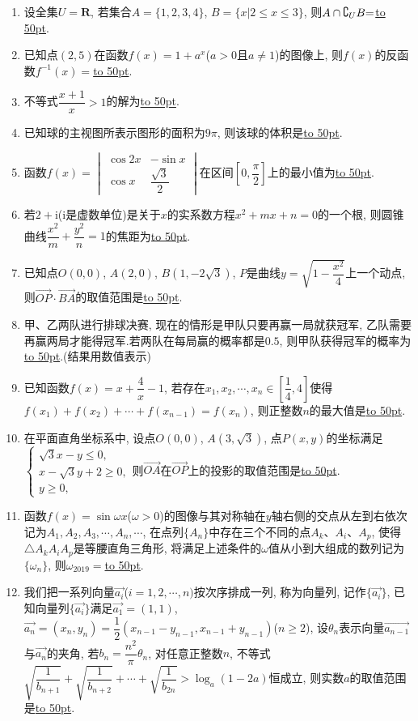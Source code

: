 \documentclass[10pt,a4paper]{article}
\newcommand{\blank}[1]{\underline{\hbox to #1pt{}}}
\begin{document}
\begin{enumerate}[1.]
\item 设全集$U=\mathbf{R}$, 若集合$A=\{1,2,3,4\}$, $B=\{x|2\le x\le 3\}$, 则$A\cap \complement _UB\text=$\blank{50}.
\item 已知点$(2,5)$在函数$f(x)=1+a^x$($a>0$且$a\ne 1$)的图像上, 则$f(x)$的反函数$f^{-1}(x)=$\blank{50}.
\item 不等式$\dfrac{x+1}x>1$的解为\blank{50}.
\item 已知球的主视图所表示图形的面积为$9\pi$, 则该球的体积是\blank{50}.
\item 函数$f(x)=\begin{vmatrix}
\cos 2x & -\sin x  \\\cos x & \dfrac{\sqrt 3}2  \end{vmatrix}$在区间$[0,\dfrac{\pi}{2}]$上的最小值为\blank{50}.
\item 若$2+\mathrm{i}$($\mathrm{i}$是虚数单位)是关于$x$的实系数方程$x^2+mx+n=0$的一个根, 则圆锥曲线$\dfrac{x^2}m+\dfrac{y^2}n=1$的焦距为\blank{50}.
\item 已知点$O(0,0)$, $A(2,0)$, $B(1,-2\sqrt 3)$, $P$是曲线$y=\sqrt {1-\dfrac{x^2}4}$上一个动点, 则$\overrightarrow{OP}\cdot \overrightarrow{BA}$的取值范围是\blank{50}.
\item 甲、乙两队进行排球决赛, 现在的情形是甲队只要再赢一局就获冠军, 乙队需要再赢两局才能得冠军.若两队在每局赢的概率都是$0.5$, 则甲队获得冠军的概率为\blank{50}.(结果用数值表示)
\item 已知函数$f(x)=x+\dfrac 4x-1$, 若存在$x_1,x_2,\cdots ,x_n\in [\dfrac 14,4]$使得$f(x_1)+f(x_2)+\cdots +f(x_{n-1})=f(x_n)$, 则正整数$n$的最大值是\blank{50}.
\item 在平面直角坐标系中, 设点$O(0,0)$, $A(3,\sqrt 3)$, 点$P(x,y)$的坐标满足$\begin{cases} \sqrt 3x-y\le 0, \\ x-\sqrt 3y+2\ge 0, \\ y\ge 0 ,\end{cases}$则$\overrightarrow{OA}$在$\overrightarrow{OP}$上的投影的取值范围是\blank{50}.
\item 函数$f(x)=\sin \omega x$($\omega >0$)的图像与其对称轴在$y$轴右侧的交点从左到右依次记为$A_1,A_2,A_3,\cdots ,A_n,\cdots$, 在点列$\{A_n\}$中存在三个不同的点$A_k$、$A_i$、$A_p$, 使得$\triangle A_kA_iA_p$是等腰直角三角形, 将满足上述条件的$\omega$值从小到大组成的数列记为$\{\omega _n\}$, 则$\omega_{2019}=$\blank{50}.
\item 我们把一系列向量$\overrightarrow{a_i}$($i=1,2,\cdots ,n)$按次序排成一列, 称为向量列, 记作$\{\overrightarrow{a_i}\}$, 已知向量列$\{\overrightarrow{a_i}\}$满足$\overrightarrow{a_1}=(1,1)$, $\overrightarrow{a_n}=(x_n,y_n)=\dfrac 12(x_{n-1}-y_{n-1},x_{n-1}+y_{n-1})$($n\ge 2$), 设$\theta_n$表示向量$\overrightarrow{a_{n-1}}$与$\overrightarrow{a_n}$的夹角, 若$b_n=\dfrac{n^2}{\pi}\theta_n$, 对任意正整数$n$, 不等式$\sqrt{\dfrac 1{b_{n+1}}}+\sqrt {\dfrac 1{b_{n+2}}}+\cdots +\sqrt {\dfrac 1{b_{2n}}}>\log_a(1-2a)$恒成立, 则实数$a$的取值范围是\blank{50}.

\end{enumerate}
\end{document}
